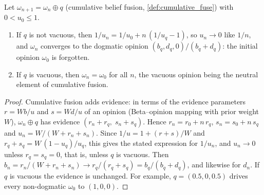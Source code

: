 \begin{theorem}\label{thm:cbf}
Let $\omega_{n+1} = \omega_n \oplus q$ (cumulative belief fusion, \cref{def:cumulative_fuse}) with $0 < u_0 \le 1$.
\begin{enumerate}
    \item If $q$ is not vacuous, then $1/u_n = 1/u_0 + n\,(1/u_q - 1)$, so $u_n \to 0$ like $1/n$, and $\omega_n$ converges to the dogmatic opinion $(b_q, d_q, 0)/(b_q + d_q)$: the initial opinion $\omega_0$ is forgotten.
    \item If $q$ is vacuous, then $\omega_n = \omega_0$ for all $n$, the vacuous opinion being the neutral element of cumulative fusion.
\end{enumerate}
\end{theorem}
\begin{proof}
Cumulative fusion adds evidence: in terms of the evidence parameters $r = W b/u$ and $s = W d/u$ of an opinion (Beta--opinion mapping with prior weight $W$), $\omega_n \oplus q$ has evidence $(r_n + r_q,\; s_n + s_q)$. Hence $r_n = r_0 + n\, r_q$, $s_n = s_0 + n\, s_q$ and $u_n = W/(W + r_n + s_n)$. Since $1/u = 1 + (r + s)/W$ and $r_q + s_q = W\,(1 - u_q)/u_q$, this gives the stated expression for $1/u_n$, and $u_n \to 0$ unless $r_q = s_q = 0$, that is, unless $q$ is vacuous. Then $b_n = r_n/(W + r_n + s_n) \to r_q/(r_q + s_q) = b_q/(b_q + d_q)$, and likewise for $d_n$. If $q$ is vacuous the evidence is unchanged. For example, $q = (0.5, 0, 0.5)$ drives every non-dogmatic $\omega_0$ to $(1, 0, 0)$.
\end{proof}

